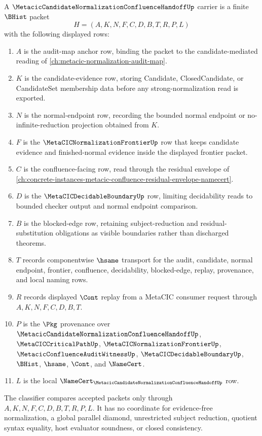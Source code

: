 \begin{definition}
\label{def:metacic-candidate-normalization-confluence-handoff-carrier}
A $\MetacicCandidateNormalizationConfluenceHandoffUp$ carrier is a finite $\BHist$ packet
$$
H=(A,K,N,F,C,D,B,T,R,P,L)
$$
with the following displayed rows:
\begin{enumerate}
\item $A$ is the audit-map anchor row, binding the packet to the candidate-mediated reading of \autoref{ch:metacic-normalization-audit-map}.
\item $K$ is the candidate-evidence row, storing Candidate, ClosedCandidate, or CandidateSet membership data before any strong-normalization read is exported.
\item $N$ is the normal-endpoint row, recording the bounded normal endpoint or no-infinite-reduction projection obtained from $K$.
\item $F$ is the $\MetaCICNormalizationFrontierUp$ row that keeps candidate evidence and finished-normal evidence inside the displayed frontier packet.
\item $C$ is the confluence-facing row, read through the residual envelope of \autoref{ch:concrete-instances-metacic-confluence-residual-envelope-namecert}.
\item $D$ is the $\MetaCICDecidableBoundaryUp$ row, limiting decidability reads to bounded checker output and normal endpoint comparison.
\item $B$ is the blocked-edge row, retaining subject-reduction and residual-substitution obligations as visible boundaries rather than discharged theorems.
\item $T$ records componentwise $\hsame$ transport for the audit, candidate, normal endpoint, frontier, confluence, decidability, blocked-edge, replay, provenance, and local naming rows.
\item $R$ records displayed $\Cont$ replay from a MetaCIC consumer request through $A,K,N,F,C,D,B,T$.
\item $P$ is the $\Pkg$ provenance over $\MetacicCandidateNormalizationConfluenceHandoffUp$, $\MetaCICCriticalPathUp$, $\MetaCICNormalizationFrontierUp$, $\MetacicConfluenceAuditWitnessUp$, $\MetaCICDecidableBoundaryUp$, $\BHist$, $\hsame$, $\Cont$, and $\NameCert$.
\item $L$ is the local $\NameCert_{\MetacicCandidateNormalizationConfluenceHandoffUp}$ row.
\end{enumerate}
The classifier compares accepted packets only through $A,K,N,F,C,D,B,T,R,P,L$. It has no coordinate for evidence-free normalization, a global parallel diamond, unrestricted subject reduction, quotient syntax equality, host evaluator soundness, or closed consistency.
\end{definition}

